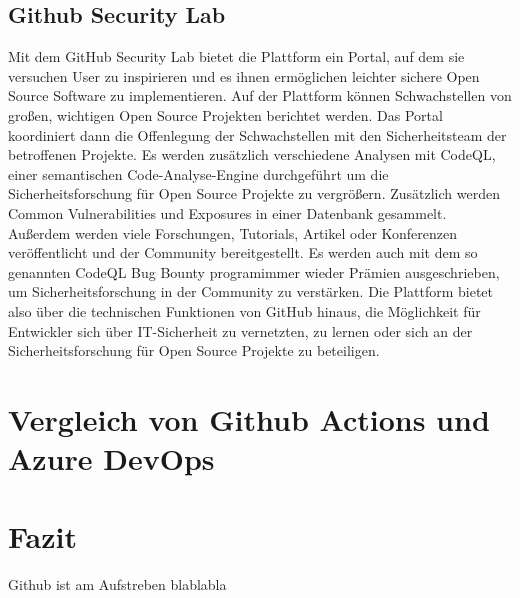 \section{Github Security Lab}
Mit dem GitHub Security Lab bietet die Plattform ein Portal, auf dem sie versuchen User zu inspirieren und es ihnen ermöglichen leichter sichere Open Source Software zu implementieren. 
Auf der Plattform können Schwachstellen von großen, wichtigen Open Source Projekten berichtet werden. Das Portal koordiniert dann die Offenlegung der Schwachstellen mit den Sicherheitsteam der betroffenen Projekte. Es werden zusätzlich verschiedene Analysen mit CodeQL, einer semantischen Code-Analyse-Engine durchgeführt um die Sicherheitsforschung für Open Source Projekte zu vergrößern. Zusätzlich werden Common Vulnerabilities und Exposures in einer Datenbank gesammelt.
Außerdem werden viele Forschungen, Tutorials, Artikel oder Konferenzen veröffentlicht und der Community bereitgestellt.
Es werden auch mit dem so genannten \glqq CodeQL Bug Bounty program\grqq immer wieder Prämien ausgeschrieben, um Sicherheitsforschung in der Community zu verstärken. Die Plattform bietet also über die technischen Funktionen von GitHub hinaus, die Möglichkeit für Entwickler sich über IT-Sicherheit zu vernetzten, zu lernen oder sich an der Sicherheitsforschung für Open Source Projekte zu beteiligen. \cite{github-securitylab}


\chapter{Vergleich von Github Actions und Azure DevOps}

\chapter{Fazit}
Github ist am Aufstreben blablabla